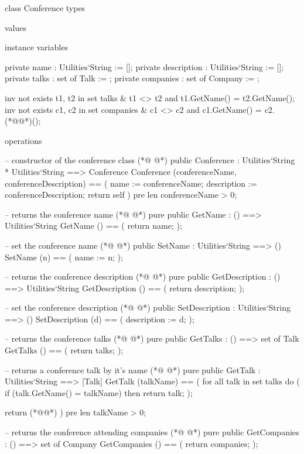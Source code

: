 \begin{vdmpp}[breaklines=true]
class Conference
types
 
values

instance variables

 private name : Utilities`String := [];
 private description : Utilities`String := [];
 private talks : set of Talk := {};
 private companies : set of Company := {};
 
 inv not exists t1, t2 in set talks & t1 <> t2 and t1.GetName() = t2.GetName();
 inv not exists c1, c2 in set companies & c1 <> c2 and c1.GetName() = c2.(*@@*)();
 
operations
  
   -- constructor of the conference class 
(*@
\label{Conference:19}
@*)
  public Conference : Utilities`String * Utilities`String ==> Conference
    Conference (conferenceName, conferenceDescription) == (
     name := conferenceName;
     description := conferenceDescription;
     return self
    )
    pre len conferenceName > 0;
    
  -- returns the conference name
(*@
\label{GetName:28}
@*)
  pure public GetName : () ==> Utilities`String
    GetName () == (
     return name;
    );
    
 -- set the conference name
(*@
\label{SetName:34}
@*)
  public SetName : Utilities`String ==> ()
    SetName (n) == (
     name := n;
    );
    
  -- returns the conference description
(*@
\label{GetDescription:40}
@*)
  pure public GetDescription : () ==> Utilities`String
    GetDescription () == (
     return description;
    );
    
  -- set the conference description
(*@
\label{SetDescription:46}
@*)
  public SetDescription : Utilities`String ==> ()
    SetDescription (d) == (
     description := d;
    );
    
  -- returns the conference talks
(*@
\label{GetTalks:52}
@*)
  pure public GetTalks : () ==> set of Talk
    GetTalks () == (
     return talks;
    );
    
   -- returns a conference talk by it's name
(*@
\label{GetTalk:58}
@*)
  pure public GetTalk : Utilities`String ==> [Talk]
    GetTalk (talkName) == (
     for all talk in set talks do (
      if (talk.GetName() = talkName)
      then return talk;
     );
     
     return (*@@*)
    )
    pre len talkName > 0;
  
   -- returns the conference attending companies
(*@
\label{GetCompanies:70}
@*)
  pure public GetCompanies : () ==> set of Company
    GetCompanies () == (
     return companies;
    );
    

\end{vdmpp}
